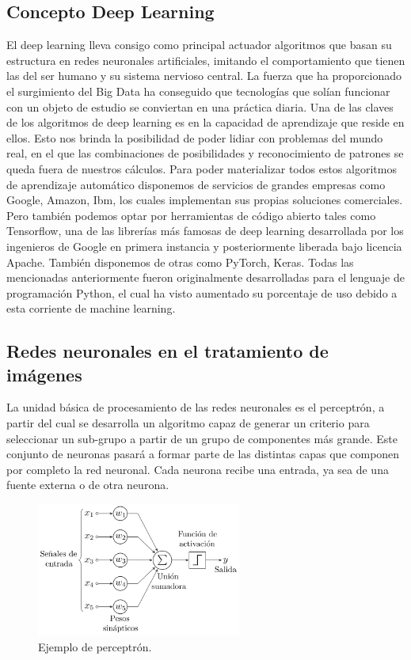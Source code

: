 \subsection{Concepto Deep Learning}\label{subsec:concepto-deep-learning}
El deep learning lleva consigo como principal actuador algoritmos que basan su estructura en redes neuronales artificiales, imitando el comportamiento que tienen las del ser humano y su sistema nervioso central.
La fuerza que ha proporcionado el surgimiento del Big Data ha conseguido que tecnologías que solían funcionar con un objeto de estudio se conviertan en una práctica
diaria.
Una de las claves de los algoritmos de deep learning es en la capacidad de aprendizaje que reside en ellos.
Esto nos brinda la posibilidad de poder lidiar con problemas del mundo real,
en el que las combinaciones de posibilidades y reconocimiento de patrones se queda fuera de nuestros cálculos.
Para poder materializar todos estos algoritmos de aprendizaje automático disponemos de servicios de grandes empresas como Google, Amazon, Ibm, los cuales
implementan sus propias soluciones comerciales.
Pero también podemos optar por herramientas de código abierto tales como Tensorflow, una de las librerías más famosas de deep learning desarrollada por los ingenieros de Google en primera instancia y posteriormente liberada bajo licencia Apache.
También disponemos de otras como PyTorch, Keras.
Todas las mencionadas anteriormente fueron originalmente desarrolladas para el lenguaje de programación Python, el cual ha visto aumentado su porcentaje de uso debido a esta corriente de
machine learning.

\subsection{Redes neuronales en el tratamiento de imágenes}\label{subsec:redes-neuronales-en-el-tratamiento-de-imágenes}
La unidad básica de procesamiento de las redes neuronales es el perceptrón, a partir del cual se desarrolla un algoritmo capaz de generar un criterio para seleccionar un sub-grupo a partir de un grupo de componentes más grande.
Este conjunto de neuronas pasará a formar parte de las distintas capas que componen por completo la red neuronal.
Cada neurona recibe una entrada, ya sea de una fuente externa o de otra neurona.

\begin{figure}
    \centering
    \includegraphics[width=0.6\textwidth]{images/chapter1/perceptron.png}
    \caption{Ejemplo de perceptrón.}
    \label{fig:Perceptrón}
\end{figure}

